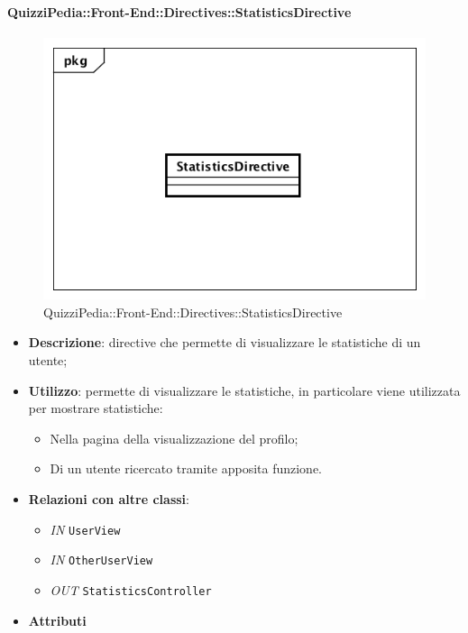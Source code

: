 \paragraph{QuizziPedia::Front-End::Directives::StatisticsDirective}

\label{QuizziPedia::Front-End::Directives::StatisticsDirective}

\begin{figure}[h]
	\centering
	\includegraphics[scale=0.5,keepaspectratio]{UML/Classi/Front-End/QuizziPedia_Front-end_Directives_StatisticsDirective.png}
	\caption{QuizziPedia::Front-End::Directives::StatisticsDirective}
\end{figure}

\begin{itemize}
	\item \textbf{Descrizione}: directive che permette di visualizzare le statistiche di un utente;
	\item \textbf{Utilizzo}: permette di visualizzare le statistiche, in particolare viene utilizzata per mostrare statistiche:
	\begin{itemize}
		\item Nella pagina della visualizzazione del profilo;
		\item Di un utente ricercato tramite apposita funzione.
	\end{itemize}
	\item \textbf{Relazioni con altre classi}:
	\begin{itemize}
		\item \textit{IN} \texttt{UserView} 
		\item \textit{IN} \texttt{OtherUserView} 
		\item \textit{OUT} \texttt{StatisticsController} 
	\end{itemize}
	\item \textbf{Attributi}
\end{itemize}

